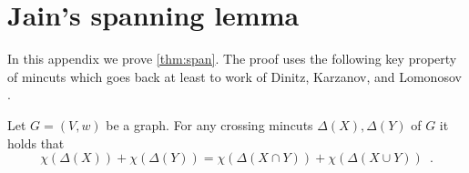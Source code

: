 




































































\appendix\setcounter{theorem}{44}\section{Jain's spanning lemma}
\label{sec:appendix}
In this appendix we prove \cref{thm:span}.  The proof uses the following key property of mincuts which goes back at least
to work of Dinitz, Karzanov, and Lomonosov \cite{DKL76}.

\begin{proposition}
\label{prop:bixby}
Let $G = (V,w)$ be a graph.
For any crossing mincuts $\Delta(X), \Delta(Y)$ of $G$
it holds that
\[
\chi(\Delta(X)) + \chi(\Delta(Y)) = \chi(\Delta(X \cap Y)) + \chi(\Delta(X \cup Y)) \enspace .
\]
\end{proposition}

